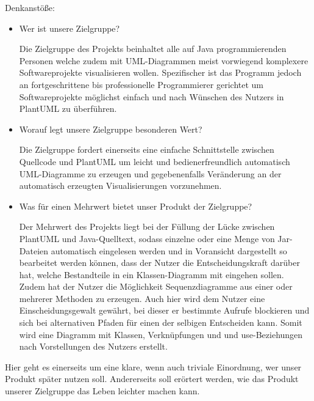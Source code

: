 Denkanstöße:
\begin{itemize}
\item Wer ist unsere Zielgruppe?


Die Zielgruppe des Projekts beinhaltet alle auf Java programmierenden Personen welche zudem mit UML-Diagrammen meist vorwiegend komplexere Softwareprojekte visualisieren wollen. Spezifischer ist das Programm jedoch an fortgeschrittene bis professionelle Programmierer gerichtet um Softwareprojekte möglichst einfach und nach Wünschen des Nutzers in PlantUML zu überführen.  


\item Worauf legt unsere Zielgruppe besonderen Wert?


Die Zielgruppe fordert einerseits eine einfache Schnittstelle zwischen Quellcode und PlantUML um leicht und bedienerfreundlich automatisch UML-Diagramme zu erzeugen und gegebenenfalls Veränderung an der automatisch erzeugten Visualisierungen vorzunehmen.


\item Was für einen Mehrwert bietet unser Produkt der Zielgruppe?


Der Mehrwert des Projekts liegt bei der Füllung der Lücke zwischen PlantUML und Java-Quelltext, sodass einzelne oder eine Menge von Jar-Dateien automatisch eingelesen werden und in Voransicht dargestellt so bearbeitet werden können, dass der Nutzer die Entscheidungskraft darüber hat, welche Bestandteile in ein Klassen-Diagramm mit eingehen sollen. Zudem hat der Nutzer die Möglichkeit Sequenzdiagramme aus einer oder mehrerer Methoden zu erzeugen. Auch hier wird dem Nutzer eine Einscheidungsgewalt gewährt, bei dieser er bestimmte Aufrufe blockieren und sich bei alternativen Pfaden für einen der selbigen Entscheiden kann. Somit wird eine Diagramm mit Klassen, Verknüpfungen und und use-Beziehungen nach Vorstellungen des Nutzers erstellt.
\end{itemize}
Hier geht es einerseits um eine klare, wenn auch triviale Einordnung, wer unser Produkt später nutzen soll. Andererseits soll erörtert werden, wie das Produkt unserer Zielgruppe das Leben leichter machen kann.
\nsecend

    
    
    


